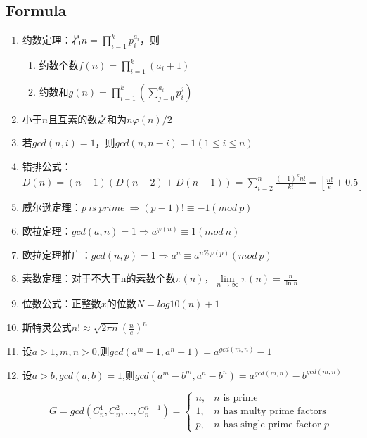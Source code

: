 \documentclass[twoside]{article}
\begin{document}
\subsection{Formula}
\begin{enumerate}
\item 约数定理：若$n=\prod_{i=1}^kp_i^{a_i}$，则

\begin{enumerate}
\item 约数个数$f(n)=\prod_{i=1}^k(a_i+1)$
\item 约数和$g(n)=\prod_{i=1}^k(\sum_{j=0}^{a_i}p_i^j)$
\end{enumerate}

\item 小于$n$且互素的数之和为$n\varphi(n)/2$

\item 若$gcd(n,i)=1$，则$gcd(n,n-i)=1(1\leq i\leq n)$

\item 错排公式：$D(n)=(n-1)(D(n-2)+D(n-1))=\sum_{i=2}^n\frac{(-1)^kn!}{k!}=[\frac{n!}{e}+0.5]$

\item 威尔逊定理：$p\ is\ prime\ \Rightarrow (p-1)!\equiv-1(mod\ p)$

\item 欧拉定理：$gcd(a,n)=1\Rightarrow a^{\varphi(n)}\equiv1(mod\ n)$

\item 欧拉定理推广：$gcd(n,p)=1\Rightarrow a^n\equiv a^{n\%\varphi(p)}(mod\ p)$

\item 素数定理：对于不大于n的素数个数$\pi(n)$，$\lim\limits_{n\to\infty}\pi(n)=\frac{n}{\ln n}$

\item 位数公式：正整数$x$的位数$N=log10(n)+1$

\item 斯特灵公式$n!\approx\sqrt{2\pi n}(\frac{n}{e})^n$

\item 设$a>1,m,n>0$,则$gcd(a^m-1,a^n-1)=a^{gcd(m,n)}-1$

\item 设$a>b,gcd(a,b)=1$,则$gcd(a^m-b^m,a^n-b^n)=a^{gcd(m,n)}-b^{gcd(m,n)}$

$$
G=gcd(C_n^1,C_n^2,...,C_n^{n-1})=
\begin{cases}
	n, & \text{$n$ is prime} \\
	1, & \text{$n$ has multy prime factors} \\
	p, & \text{$n$ has single prime factor $p$} 
\end{cases}
$$


\end{enumerate}
\end{document}

